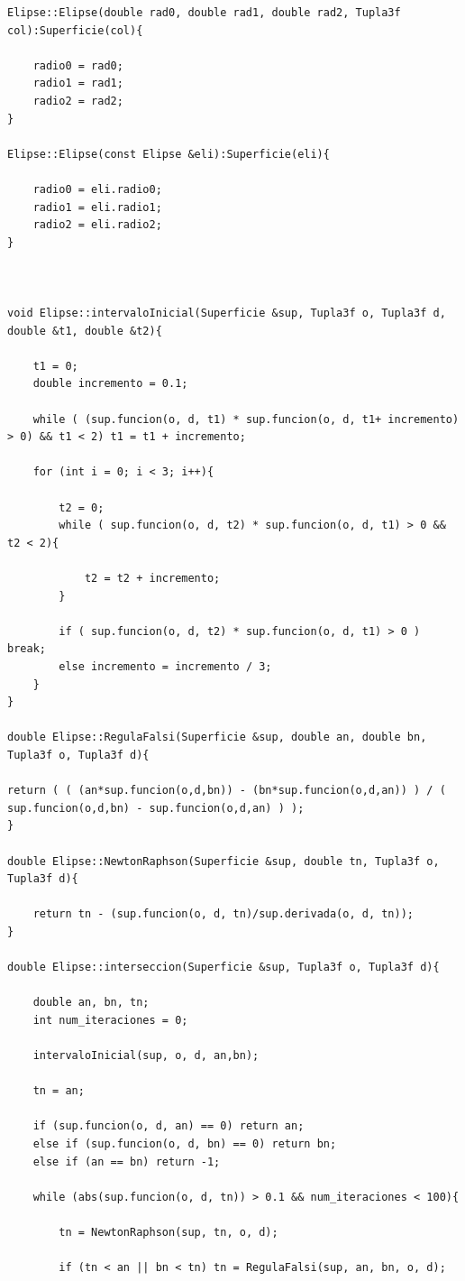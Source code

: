 \begin{lstlisting}[style=Consola]
Elipse::Elipse(double rad0, double rad1, double rad2, Tupla3f col):Superficie(col){

	radio0 = rad0;
	radio1 = rad1;
	radio2 = rad2;
}

Elipse::Elipse(const Elipse &eli):Superficie(eli){

	radio0 = eli.radio0;
	radio1 = eli.radio1;
	radio2 = eli.radio2;
}



void Elipse::intervaloInicial(Superficie &sup, Tupla3f o, Tupla3f d, double &t1, double &t2){

	t1 = 0;
	double incremento = 0.1;
	
	while ( (sup.funcion(o, d, t1) * sup.funcion(o, d, t1+ incremento) > 0) && t1 < 2) t1 = t1 + incremento;
	
	for (int i = 0; i < 3; i++){
	
		t2 = 0;
		while ( sup.funcion(o, d, t2) * sup.funcion(o, d, t1) > 0 && t2 < 2){
		
			t2 = t2 + incremento;
		}

		if ( sup.funcion(o, d, t2) * sup.funcion(o, d, t1) > 0 ) break;
		else incremento = incremento / 3;
	}
}

double Elipse::RegulaFalsi(Superficie &sup, double an, double bn, Tupla3f o, Tupla3f d){

return ( ( (an*sup.funcion(o,d,bn)) - (bn*sup.funcion(o,d,an)) ) / ( sup.funcion(o,d,bn) - sup.funcion(o,d,an) ) );
}

double Elipse::NewtonRaphson(Superficie &sup, double tn, Tupla3f o, Tupla3f d){

	return tn - (sup.funcion(o, d, tn)/sup.derivada(o, d, tn));
}

double Elipse::interseccion(Superficie &sup, Tupla3f o, Tupla3f d){

	double an, bn, tn;
	int num_iteraciones = 0;

	intervaloInicial(sup, o, d, an,bn);
	
	tn = an;
	
	if (sup.funcion(o, d, an) == 0) return an;
	else if (sup.funcion(o, d, bn) == 0) return bn;
	else if (an == bn) return -1;

	while (abs(sup.funcion(o, d, tn)) > 0.1 && num_iteraciones < 100){

		tn = NewtonRaphson(sup, tn, o, d);

		if (tn < an || bn < tn) tn = RegulaFalsi(sup, an, bn, o, d);
		

\end{lstlisting}
